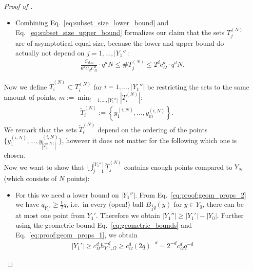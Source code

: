 \documentclass[a4paper, 10pt]{article}
\begin{document}
\begin{proof}[Proof of ]
\begin{itemize}
\begin{align*}
%
\bigcup_{y \in T_j^{(N)}} B_{q_{Y_N}}(y) &\subset B_{\frac{1}{3}q + q_{Y_N}}(y''_j) \\
\Rightarrow \quad \#T_j^{(N)} \cdot C_d q_{Y_N}^d &\leq C_d \cdot \left( \frac{1}{3}q + q_{Y_N} \right)^d \leq C_d q^d
\end{align*}
Using the geometric bounds from Eq.\ \eqref{eq:geometric_bounds} and the asymptotical uniform distribution of Eq.\ \eqref{eq:geometric_uniformity} we arrive at
\begin{align}
\label{eq:subset_size_upper_bound}
\#T_j^{(N)} &\leq q^d \cdot q_{Y_N}^{-d} \leq q^d 2^d c_\Omega^d N.
\end{align}
\item Combining Eq.\ \eqref{eq:subset_size_lower_bound} and Eq.\ \eqref{eq:subset_size_upper_bound} formalizes our claim that the sets $T_j^{(N)}$ are of asymptotical equal size, 
because the lower and upper bound do actually not depend on $j = 1, ..., |Y_1''|$:
\begin{align}
\label{eq:subset_size_asymp}
\frac{C_{d, \alpha}}{6^d C_d C_\Omega^d} \cdot q^d N \leq 
\#T_j^{(N)} 
\leq 2^d c_\Omega^d \cdot q^d N.
\end{align}
\end{itemize}
Now we define $\tilde{T}_i^{(N)} \subset T_i^{(N)}$ for $i=1, ..., |Y_1''|$ be restricting the sets to the same amount of points, $m := \min_{i=1, ..., |Y_1''|} |T_i^{(N)}|$:
\begin{align*}
\tilde{T}_i^{(N)} := \left\{ y_1^{(i, N)}, ..., y_m^{(i, N)} \right\}.
\end{align*}
We remark that the sets $\tilde{T}_i^{(N)}$ depend on the ordering of the points $\{ y_1^{(i, N)}, ..., y_{|T_i^{(N)}|}^{(i, N)} \}$, however it does not matter for the following which one is chosen. \\
Now we want to show that $\bigcup_{j=1}^{|Y_1''|} \tilde{T}_j^{(N)}$ contains enough points compared to $Y_N$ (which consists of $N$ points):
\begin{itemize}
\item For this we need a lower bound on $|Y_1''|$.
From Eq.\ \eqref{eq:proof:geom_props_2} we have $q_{Y_1'} \geq \frac{1}{2}q$, i.e.\ in every (open!) ball $B_{\frac{1}{2} q}(y)$ for $y \in Y_0$, there can be at most one point from $Y_1'$.
Therefore we obtain $|Y_1''| \geq |Y_1'| - |Y_0|$.
Further using the geometric bound Eq.~\eqref{eq:geometric_bounds} and Eq.~\eqref{eq:proof:geom_props_1}, we obtain
\begin{align*}
|Y_1'| \geq c_\Omega^{d} h_{Y_1', \Omega}^{-d} \geq c_\Omega^d (2q)^{-d} = 2^{-d} c_\Omega^d q^{-d} 

\end{align*}
\end{itemize}
\end{proof}
\end{document}

